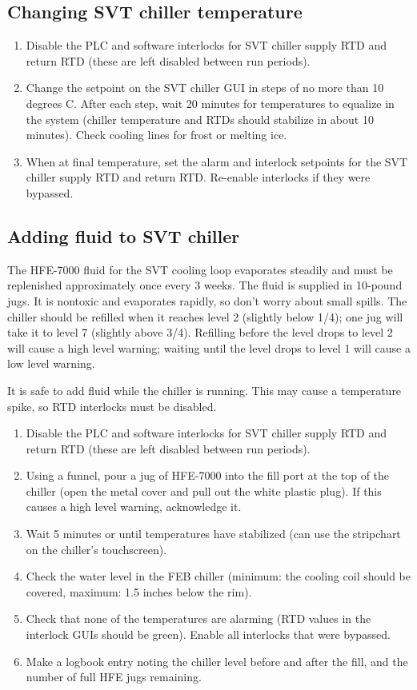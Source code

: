 \subsection{Changing SVT chiller temperature}
\label{sec:proc_svt_chiller_tempchange}
\begin{enumerate}
    \item Disable the PLC and software interlocks for SVT chiller supply RTD and return RTD (these are left disabled between run periods).
    \item Change the setpoint on the SVT chiller GUI in steps of no more than 10 degrees C.
        After each step, wait 20 minutes for temperatures to equalize in the system (chiller temperature and RTDs should stabilize in about 10 minutes).
        Check cooling lines for frost or melting ice.
    \item When at final temperature, set the alarm and interlock setpoints for the SVT chiller supply RTD and return RTD.
        Re-enable interlocks if they were bypassed.
\end{enumerate}

\subsection{Adding fluid to SVT chiller}
\label{sec:proc_svt_chiller_refill}
The HFE-7000 fluid for the SVT cooling loop evaporates steadily and must be replenished approximately once every 3 weeks.
The fluid is supplied in 10-pound jugs. It is nontoxic and evaporates rapidly, so don't worry about small spills.
The chiller should be refilled when it reaches level 2 (slightly below 1/4); one jug will take it to level 7 (slightly above 3/4).
Refilling before the level drops to level 2 will cause a high level warning; waiting until the level drops to level 1 will cause a low level warning.

It is safe to add fluid while the chiller is running. This may cause a temperature spike, so RTD interlocks must be disabled.

\begin{enumerate}
    \item Disable the PLC and software interlocks for SVT chiller supply RTD and return RTD (these are left disabled between run periods).
    \item Using a funnel, pour a jug of HFE-7000 into the fill port at the top of the chiller (open the metal cover and pull out the white plastic plug). If this causes a high level warning, acknowledge it.
    \item Wait 5 minutes or until temperatures have stabilized (can use the stripchart on the chiller's touchscreen).
    \item Check the water level in the FEB chiller (minimum: the cooling coil should be covered, maximum: 1.5 inches below the rim).
    \item Check that none of the temperatures are alarming (RTD values in the interlock GUIs should be green). Enable all interlocks that were bypassed.
    \item Make a logbook entry noting the chiller level before and after the fill, and the number of full HFE jugs remaining.
\end{enumerate}

